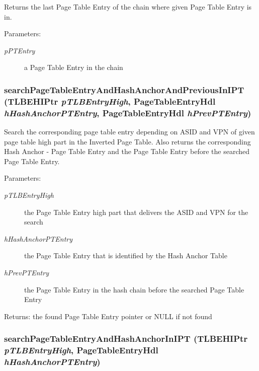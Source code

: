 Returns the last Page Table Entry of the chain where given Page Table Entry is in. \begin{Desc}
\item[Parameters:]
\begin{description}
\item[{\em pPTEntry}]a Page Table Entry in the chain \end{description}
\end{Desc}
\hypertarget{group___v_m_m___i_p_t_g4495d1e87487776b13d7c0f8c8c75ec9}{
\subsubsection[{searchPageTableEntryAndHashAnchorAndPreviousInIPT}]{ searchPageTableEntryAndHashAnchorAndPreviousInIPT ({\bf TLBEHIPtr} {\em pTLBEntryHigh}, \/  {\bf PageTableEntryHdl} {\em hHashAnchorPTEntry}, \/  {\bf PageTableEntryHdl} {\em hPrevPTEntry})}}
\label{group___v_m_m___i_p_t_g4495d1e87487776b13d7c0f8c8c75ec9}


Search the corresponding page table entry depending on ASID and VPN of given page table high part in the Inverted Page Table. Also returns the corresponding Hash Anchor - Page Table Entry and the Page Table Entry before the searched Page Table Entry. \begin{Desc}
\item[Parameters:]
\begin{description}
\item[{\em pTLBEntryHigh}]the Page Table Entry high part that delivers the ASID and VPN for the search \item[{\em hHashAnchorPTEntry}]the Page Table Entry that is identified by the Hash Anchor Table \item[{\em hPrevPTEntry}]the Page Table Entry in the hash chain before the searched Page Table Entry \end{description}
\end{Desc}
\begin{Desc}
\item[Returns:]the found Page Table Entry pointer or NULL if not found \end{Desc}
\hypertarget{group___v_m_m___i_p_t_g1ce348812f454f6c840bbbbcbad37add}{
\subsubsection[{searchPageTableEntryAndHashAnchorInIPT}]{ searchPageTableEntryAndHashAnchorInIPT ({\bf TLBEHIPtr} {\em pTLBEntryHigh}, \/  {\bf PageTableEntryHdl} {\em hHashAnchorPTEntry})}}
\label{group___v_m_m___i_p_t_g1ce348812f454f6c840bbbbcbad37add}


